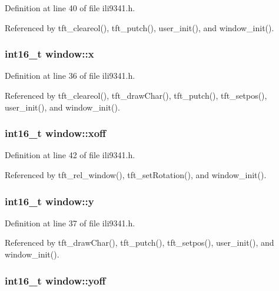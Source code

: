 Definition at line 40 of file ili9341.\-h.



Referenced by tft\-\_\-cleareol(), tft\-\_\-putch(), user\-\_\-init(), and window\-\_\-init().

\hypertarget{structwindow_a879b99940dfc34772f0257f54c67b817}{
\subsubsection[{x}]{\setlength{\rightskip}{0pt plus 5cm}int16\-\_\-t window\-::x}}\label{structwindow_a879b99940dfc34772f0257f54c67b817}


Definition at line 36 of file ili9341.\-h.



Referenced by tft\-\_\-cleareol(), tft\-\_\-draw\-Char(), tft\-\_\-putch(), tft\-\_\-setpos(), user\-\_\-init(), and window\-\_\-init().

\hypertarget{structwindow_a12d0408f393bc8d23cc3f1ce46c39879}{
\subsubsection[{xoff}]{\setlength{\rightskip}{0pt plus 5cm}int16\-\_\-t window\-::xoff}}\label{structwindow_a12d0408f393bc8d23cc3f1ce46c39879}


Definition at line 42 of file ili9341.\-h.



Referenced by tft\-\_\-rel\-\_\-window(), tft\-\_\-set\-Rotation(), and window\-\_\-init().

\hypertarget{structwindow_a95c7023fc42e79ab42c291b90a490776}{
\subsubsection[{y}]{\setlength{\rightskip}{0pt plus 5cm}int16\-\_\-t window\-::y}}\label{structwindow_a95c7023fc42e79ab42c291b90a490776}


Definition at line 37 of file ili9341.\-h.



Referenced by tft\-\_\-draw\-Char(), tft\-\_\-putch(), tft\-\_\-setpos(), user\-\_\-init(), and window\-\_\-init().

\hypertarget{structwindow_a95c482caa25e4a283d962643d410bc29}{
\subsubsection[{yoff}]{\setlength{\rightskip}{0pt plus 5cm}int16\-\_\-t window\-::yoff}}\label{structwindow_a95c482caa25e4a283d962643d410bc29}


